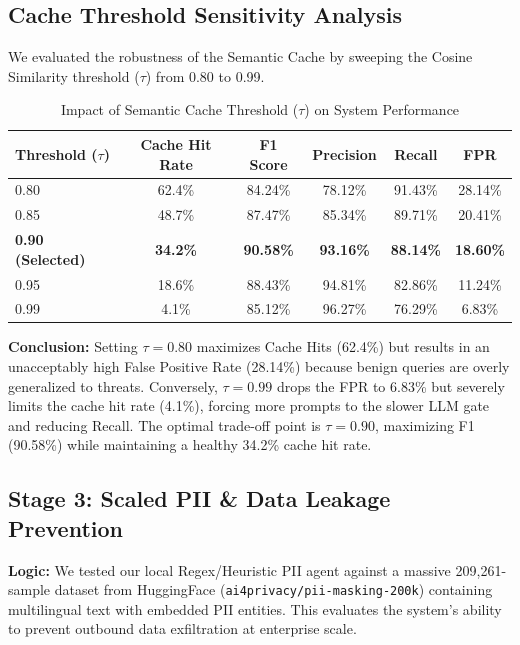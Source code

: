 \documentclass[12pt,a4paper]{article}
\begin{document}
\subsection{Cache Threshold Sensitivity Analysis}

We evaluated the robustness of the Semantic Cache by sweeping the Cosine Similarity threshold ($\tau$) from 0.80 to 0.99.

\begin{table}[H]
\centering
\caption{Impact of Semantic Cache Threshold ($\tau$) on System Performance}
\label{tab:threshold-sensitivity}
\begin{tabular}{@{}lccccc@{}}
\toprule
\textbf{Threshold ($\tau$)} & \textbf{Cache Hit Rate} & \textbf{F1 Score} & \textbf{Precision} & \textbf{Recall} & \textbf{FPR} \\
\midrule
0.80 & 62.4\% & 84.24\% & 78.12\% & 91.43\% & 28.14\% \\
0.85 & 48.7\% & 87.47\% & 85.34\% & 89.71\% & 20.41\% \\
\textbf{0.90 (Selected)} & \textbf{34.2\%} & \textbf{90.58\%} & \textbf{93.16\%} & \textbf{88.14\%} & \textbf{18.60\%} \\
0.95 & 18.6\% & 88.43\% & 94.81\% & 82.86\% & 11.24\% \\
0.99 & 4.1\% & 85.12\% & 96.27\% & 76.29\% & 6.83\% \\
\bottomrule
\end{tabular}
\end{table}

\textbf{Conclusion:} Setting $\tau=0.80$ maximizes Cache Hits (62.4\%) but results in an unacceptably high False Positive Rate (28.14\%) because benign queries are overly generalized to threats. Conversely, $\tau=0.99$ drops the FPR to 6.83\% but severely limits the cache hit rate (4.1\%), forcing more prompts to the slower LLM gate and reducing Recall. The optimal trade-off point is $\tau=0.90$, maximizing F1 (90.58\%) while maintaining a healthy 34.2\% cache hit rate.

\subsection{Stage 3: Scaled PII \& Data Leakage Prevention}

\textbf{Logic:} We tested our local Regex/Heuristic PII agent against a massive 209,261-sample dataset from HuggingFace (\texttt{ai4privacy/pii-masking-200k}) containing multilingual text with embedded PII entities. This evaluates the system's ability to prevent outbound data exfiltration at enterprise scale.
\end{document}
